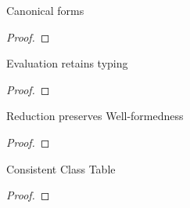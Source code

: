 \documentclass[acmlarge, anonymous, authordraft, review]{acmart} %
\begin{document}
\begin{lemma}{Canonical forms}{}
  \begin{conds}
    \cond{$\WFp\K{\e~\s}$}    
    \cond{$\EnvType\cdot\s\K\a\C$}
  \end{conds}

  \then\axiom{$\s[\a\mapsto{\obj\C{\b\a}}]$}

  \begin{proof} \innat
  \end{proof}
\end{lemma}

\begin{lemma}{Evaluation retains typing}{}
  \begin{conds}
    \cond{$\EnvType\cdot\s\K\e\t$}    
    \cond{$\EnvType\cdot\s\K\ep\tp$}
    \cond{$\WFp\K{\ep~\s}$}
    \cond{$\Reduce\K\ep\s\Kp\epp\sp$}
  \end{conds}

  \then{}

  \begin{proof} 
  \end{proof}
\end{lemma}

\begin{lemma}{Reduction preserves Well-formedness}{}
  \begin{conds}
    \cond{$\Reduce \K\e\s \Kp\ep\sp$}    
    \cond{$\WFp\K{\e~\s}$}
  \end{conds}

  \then\axiom{$\WFp\Kp{\ep~\sp}$}

  \begin{proof} 
  \end{proof}
\end{lemma}

\begin{lemma}{Consistent Class Table}{}
  \begin{conds}
    \cond{$\WFp\K{\e~\s}$}    
  \end{conds}

  \then{}

  \begin{proof} 
  \end{proof}
\end{lemma}


\end{document}
